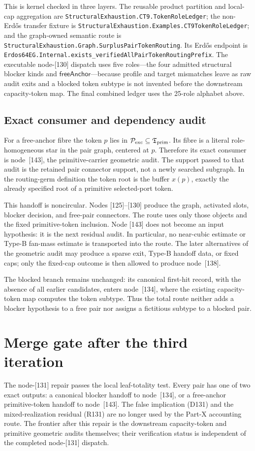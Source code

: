 \documentclass[11pt]{article}
\begin{document}
This is kernel checked in three layers.  The reusable product partition and
local-cap aggregation are
\texttt{StructuralExhaustion.CT9.TokenRoleLedger}; the non-Erd\H{o}s transfer
fixture is \texttt{StructuralExhaustion.Examples.CT9TokenRoleLedger}; and the
graph-owned semantic route is
\texttt{StructuralExhaustion.Graph.SurplusPairTokenRouting}.  Its Erd\H{o}s
endpoint is
\texttt{Erdos64EG.Internal.exists\_verifiedAllPairTokenRoutingPrefix}.
The executable node-[130] dispatch uses five roles---the four admitted
structural blocker kinds and \(\mathsf{freeAnchor}\)---because profile and
target mismatches leave as raw audit exits and a blocked token subtype is not
invented before the downstream capacity-token map.  The final combined ledger
uses the 25-role alphabet above.

\subsection*{Exact consumer and dependency audit}

For a free-anchor fibre the token \(p\) lies in
\(\mathcal P_{\rm exc}\subseteq\mathfrak T_{\rm prim}\).  Its fibre is a
literal role-homogeneous star in the pair graph, centered at \(p\).  Therefore
its exact consumer is node~[143], the primitive-carrier geometric audit.  The
support passed to that audit is the retained pair connector support, not a
newly searched subgraph.  In the routing-germ definition the token root is
the buffer \(x(p)\), exactly the already specified root of a primitive
selected-port token.

This handoff is noncircular.  Nodes [125]--[130] produce the graph, activated
slots, blocker decision, and free-pair connectors.  The route uses only those
objects and the fixed primitive-token inclusion.  Node [143] does not become
an input hypothesis: it is the next residual audit.  In particular, no
near-cubic estimate or Type-B fan-mass estimate is transported into the
route.  The later alternatives of the geometric audit may produce a sparse
exit, Type-B handoff data, or fixed caps; only the fixed-cap outcome is then
allowed to produce node~[138].

The blocked branch remains unchanged: its canonical first-hit record, with
the absence of all earlier candidates, enters node~[134], where the existing
capacity-token map computes the token subtype.  Thus the total route neither
adds a blocker hypothesis to a free pair nor assigns a fictitious subtype to
a blocked pair.

\section{Merge gate after the third iteration}

The node-[131] repair passes the local leaf-totality test.  Every pair has one
of two exact outputs: a canonical blocker handoff to node~[134], or a
free-anchor primitive-token handoff to node~[143].  The false implication
(D131) and the mixed-realization residual (R131) are no longer used by the
Part-X accounting route.  The frontier after this repair is the downstream
capacity-token and primitive geometric audits themselves; their verification
status is independent of the completed node-[131] dispatch.
\end{document}
